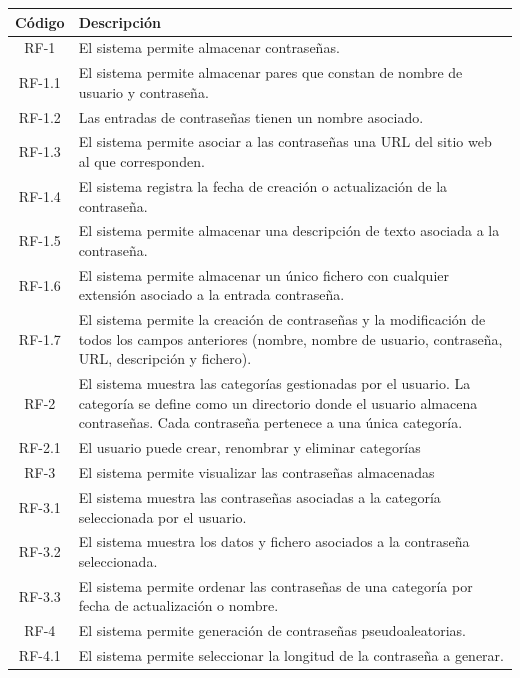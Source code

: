 \documentclass{article}
\begin{document}
\begin{table}[H]
   \centering
   \begin{tabular}{| c | p{30em} |}
   \hline
       Código &  Descripción  \\ \hline
       RF-1 & El sistema permite almacenar contraseñas. \\ \hline
       RF-1.1 & El sistema permite almacenar pares que constan de nombre de usuario y contraseña.  \\ \hline
       RF-1.2 & Las entradas de contraseñas tienen un nombre asociado. \\ \hline
       RF-1.3 & El sistema permite asociar a las contraseñas una URL del sitio web al que corresponden. \\ \hline
       RF-1.4 & El sistema registra la fecha de creación o actualización de la contraseña. \\ \hline
       RF-1.5 & El sistema permite almacenar una descripción de texto asociada a la contraseña. \\ \hline
       RF-1.6 & El sistema permite almacenar un único fichero con cualquier extensión asociado a la entrada contraseña. \\ \hline
       RF-1.7 & El sistema permite la creación de contraseñas y la modificación de todos los campos anteriores (nombre, nombre de usuario, contraseña, URL, descripción y fichero). \\ \hline
       RF-2 & El sistema muestra las categorías gestionadas por el usuario. La categoría se define como un directorio donde el usuario almacena contraseñas. Cada contraseña pertenece a una única categoría.\\ \hline
       RF-2.1 & El usuario puede crear, renombrar y eliminar categorías \\ \hline
       RF-3 & El sistema permite visualizar las contraseñas almacenadas\\ \hline
       RF-3.1 & El sistema muestra las contraseñas asociadas a la categoría seleccionada por el usuario. \\ \hline
       RF-3.2 & El sistema muestra los datos y fichero asociados a la contraseña seleccionada. \\ \hline
       RF-3.3 & El sistema permite ordenar las contraseñas de una categoría por fecha de actualización o nombre. \\ \hline
       RF-4 & El sistema permite generación de contraseñas pseudoaleatorias. \\ \hline
       RF-4.1 & El sistema permite seleccionar la longitud de la contraseña a generar.\\ \hline

\end{tabular}
\end{table}
\end{document}

